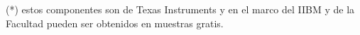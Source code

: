 
(*) estos componentes son de Texas Instruments y en el marco del IIBM y de la Facultad pueden ser obtenidos en muestras gratis.



